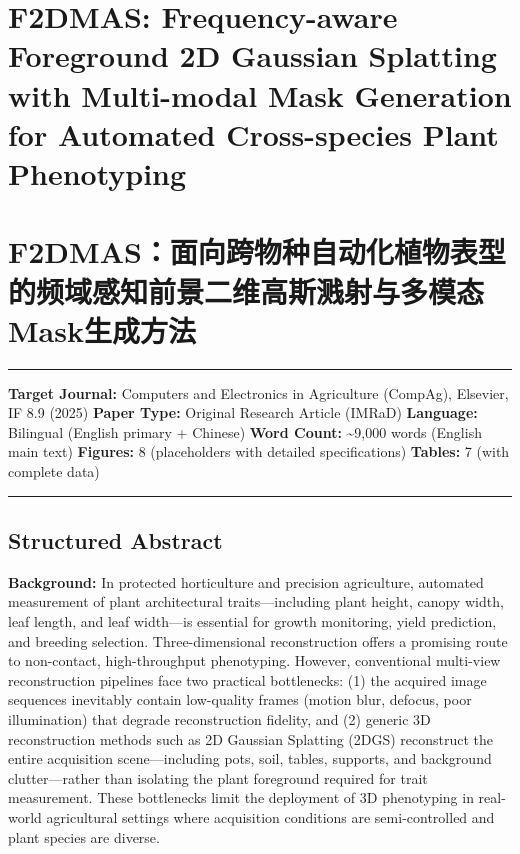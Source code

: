 \documentclass[11pt,a4paper]{article}
\begin{document}
\section{F2DMAS: Frequency-aware Foreground 2D Gaussian Splatting with
Multi-modal Mask Generation for Automated Cross-species Plant
Phenotyping}\label{f2dmas-frequency-aware-foreground-2d-gaussian-splatting-with-multi-modal-mask-generation-for-automated-cross-species-plant-phenotyping}

\section{F2DMAS：面向跨物种自动化植物表型的频域感知前景二维高斯溅射与多模态Mask生成方法}\label{f2dmasux9762ux5411ux8de8ux7269ux79cdux81eaux52a8ux5316ux690dux7269ux8868ux578bux7684ux9891ux57dfux611fux77e5ux524dux666fux4e8cux7ef4ux9ad8ux65afux6e85ux5c04ux4e0eux591aux6a21ux6001maskux751fux6210ux65b9ux6cd5}

\begin{center}\rule{0.5\linewidth}{0.5pt}\end{center}

\textbf{Target Journal:} Computers and Electronics in Agriculture
(CompAg), Elsevier, IF 8.9 (2025) \textbf{Paper Type:} Original Research
Article (IMRaD) \textbf{Language:} Bilingual (English primary + Chinese)
\textbf{Word Count:} \textasciitilde9,000 words (English main text)
\textbf{Figures:} 8 (placeholders with detailed specifications)
\textbf{Tables:} 7 (with complete data)

\begin{center}\rule{0.5\linewidth}{0.5pt}\end{center}

\subsection{Structured Abstract}\label{structured-abstract}

\textbf{Background:} In protected horticulture and precision
agriculture, automated measurement of plant architectural
traits---including plant height, canopy width, leaf length, and leaf
width---is essential for growth monitoring, yield prediction, and
breeding selection. Three-dimensional reconstruction offers a promising
route to non-contact, high-throughput phenotyping. However, conventional
multi-view reconstruction pipelines face two practical bottlenecks: (1)
the acquired image sequences inevitably contain low-quality frames
(motion blur, defocus, poor illumination) that degrade reconstruction
fidelity, and (2) generic 3D reconstruction methods such as 2D Gaussian
Splatting (2DGS) reconstruct the entire acquisition scene---including
pots, soil, tables, supports, and background clutter---rather than
isolating the plant foreground required for trait measurement. These
bottlenecks limit the deployment of 3D phenotyping in real-world
agricultural settings where acquisition conditions are semi-controlled
and plant species are diverse.
\end{document}
